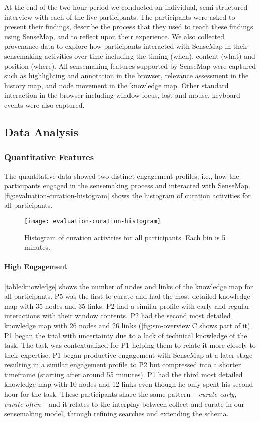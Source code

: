 At the end of the two-hour period we conducted an individual, semi-structured interview with each of the five participants. The participants were asked to present their findings, describe the process that they used to reach these findings using SenseMap, and to reflect upon their experience. We also collected provenance data to explore how participants interacted with SenseMap in their sensemaking activities over time including the timing (when), content (what) and position (where). All sensemaking features supported by SenseMap were captured such as highlighting and annotation in the browser, relevance assessment in the history map, and node movement in the knowledge map. Other standard interaction in the browser including window focus, lost and mouse, keyboard events were also captured.

\subsection{Data Analysis}

\subsubsection{Quantitative Features}
The quantitative data showed two distinct engagement profiles; i.e., how the participants engaged in the sensemaking process and interacted with SenseMap.  \autoref{fig:evaluation-curation-histogram} shows the histogram of curation activities for all participants.

\begin{figure}[!htb]
	\centering
	\texttt{[image: evaluation-curation-histogram]}
	\caption{Histogram of curation activities for all participants. Each bin is 5 minutes.}
	\label{fig:evaluation-curation-histogram}
\end{figure}

\paragraph{High Engagement}
\autoref{table:knowledge} shows the number of nodes and links of the knowledge map for all participants. P5 was the first to curate and had the most detailed knowledge map with 35 nodes and 35 links. P2 had a similar profile with early and regular interactions with their window contents. P2 had the second most detailed knowledge map with 26 nodes and 26 links (\autoref{fig:sm-overview}C shows part of it). P1 began the trial with uncertainty due to a lack of technical knowledge of the task. The task was contextualized for P1 helping them to relate it more closely to their expertise. P1 began productive engagement with SenseMap at a later stage resulting in a similar engagement profile to P2 but compressed into a shorter timeframe (starting after around 55 minutes). P1 had the third most detailed knowledge map with 10 nodes and 12 links even though he only spent his second hour for the task. These participants share the same pattern --  \textit{curate early, curate often} -- and it relates to the interplay between collect and curate in our sensemaking model, through refining searches and extending the schema.

